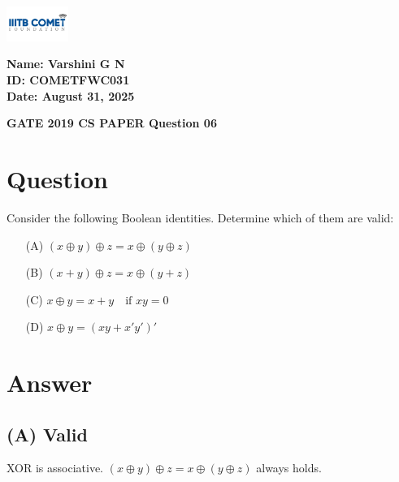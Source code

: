 \documentclass[12pt,a4paper]{article}
\begin{document}
\noindent
\begin{minipage}{0.2\linewidth}
    \includegraphics[width=2cm]{iiit_logo.png} %
\end{minipage}
\hfill
\begin{minipage}{0.7\linewidth}
    \begin{flushright}
        \textbf{Name: Varshini G N} \\ 
        \textbf{ID: COMETFWC031} \\ 
        \textbf{Date: August 31, 2025} \\
    \end{flushright}
\end{minipage}

\vspace{1cm}

\begin{center}
    {\LARGE \textbf{GATE 2019 CS PAPER Question 06}} \\
\end{center}

\vspace{0.5cm}

\section*{Question}
Consider the following Boolean identities. Determine which of them are valid:

\begin{enumerate}
    \item[(A)] $(x \oplus y) \oplus z = x \oplus (y \oplus z)$
    \item[(B)] $(x + y) \oplus z = x \oplus (y + z)$
    \item[(C)] $x \oplus y = x + y \quad \text{if } xy = 0$
    \item[(D)] $x \oplus y = (xy + x'y')'$
\end{enumerate}

\section*{Answer}

\subsection*{(A) Valid}
XOR is associative. $(x \oplus y) \oplus z = x \oplus (y \oplus z)$ always holds.
\end{document}
